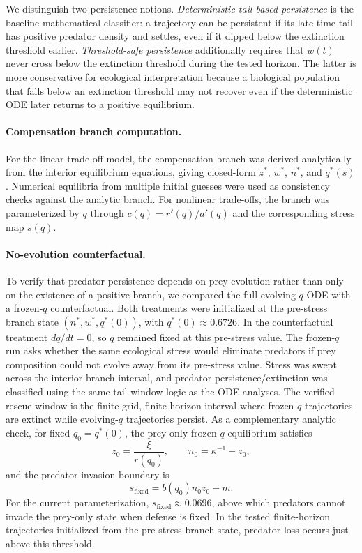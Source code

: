 \documentclass[11pt]{article}
\begin{document}
We distinguish two persistence notions. \emph{Deterministic tail-based persistence} is the baseline mathematical classifier: a trajectory can be persistent if its late-time tail has positive predator density and settles, even if it dipped below the extinction threshold earlier. \emph{Threshold-safe persistence} additionally requires that \(w(t)\) never cross below the extinction threshold during the tested horizon. The latter is more conservative for ecological interpretation because a biological population that falls below an extinction threshold may not recover even if the deterministic ODE later returns to a positive equilibrium.

\paragraph{Compensation branch computation.}
For the linear trade-off model, the compensation branch was derived analytically from the interior equilibrium equations, giving closed-form \(z^*\), \(w^*\), \(n^*\), and \(q^*(s)\). Numerical equilibria from multiple initial guesses were used as consistency checks against the analytic branch. For nonlinear trade-offs, the branch was parameterized by \(q\) through \(c(q)=r'(q)/a'(q)\) and the corresponding stress map \(s(q)\).

\paragraph{No-evolution counterfactual.}
To verify that predator persistence depends on prey evolution rather than only on the existence of a positive branch, we compared the full evolving-\(q\) ODE with a frozen-\(q\) counterfactual. Both treatments were initialized at the pre-stress branch state \((n^*,w^*,q^*(0))\), with \(q^*(0)\approx0.6726\). In the counterfactual treatment \(dq/dt=0\), so \(q\) remained fixed at this pre-stress value. The frozen-\(q\) run asks whether the same ecological stress would eliminate predators if prey composition could not evolve away from its pre-stress value. Stress was swept across the interior branch interval, and predator persistence/extinction was classified using the same tail-window logic as the ODE analyses. The verified rescue window is the finite-grid, finite-horizon interval where frozen-\(q\) trajectories are extinct while evolving-\(q\) trajectories persist. As a complementary analytic check, for fixed \(q_0=q^*(0)\), the prey-only frozen-\(q\) equilibrium satisfies
\[
z_0=\frac{\xi}{r(q_0)},\qquad n_0=\kappa^{-1}-z_0,
\]
and the predator invasion boundary is
\[
s_{\mathrm{fixed}}=b(q_0)n_0z_0-m.
\]
For the current parameterization, \(s_{\mathrm{fixed}}\approx0.0696\), above which predators cannot invade the prey-only state when defense is fixed. In the tested finite-horizon trajectories initialized from the pre-stress branch state, predator loss occurs just above this threshold.
\end{document}
